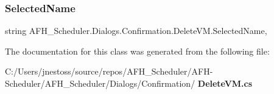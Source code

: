 \subsubsection{SelectedName}
{\footnotesize\ttfamily string A\+F\+H\+\_\+\+Scheduler.\+Dialogs.\+Confirmation.\+Delete\+V\+M.\+Selected\+Name\hspace{0.3cm}{\ttfamily [get]}, {\ttfamily [set]}}



The documentation for this class was generated from the following file\+:\begin{DoxyCompactItemize}
\item 
C\+:/\+Users/jnestoss/source/repos/\+A\+F\+H\+\_\+\+Scheduler/\+A\+F\+H-\/\+Scheduler/\+A\+F\+H\+\_\+\+Scheduler/\+Dialogs/\+Confirmation/\textbf{ Delete\+V\+M.\+cs}\end{DoxyCompactItemize}
